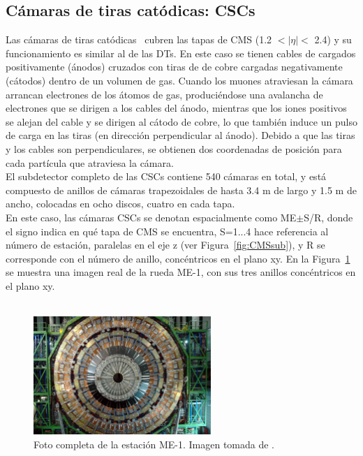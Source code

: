 \subsection{C\'amaras de tiras cat\'odicas: CSCs}\label{sec:CSCs}

Las c\'amaras de tiras cat\'odicas~\cite{CSCperformance} cubren las tapas de CMS (1.2 $< \lvert \eta \rvert <$ 2.4) y su funcionamiento es similar al de las DTs. En este caso se tienen cables de cargados positivamente (\'anodos) cruzados con tiras de de cobre cargadas negativamente (c\'atodos) dentro de un volumen de gas. Cuando los muones atraviesan la c\'amara arrancan electrones de los \'atomos de gas, produci\'endose una avalancha de electrones que se dirigen a los cables del \'anodo, mientras que los iones positivos se alejan del cable y se dirigen al c\'atodo de cobre, lo que tambi\'en induce un pulso de carga en las tiras (en direcci\'on perpendicular al \'anodo). Debido a que las tiras y los cables son perpendiculares, se obtienen dos coordenadas de posici\'on para cada part\'icula que atraviesa la c\'amara. \\

El subdetector completo de las CSCs contiene 540 c\'amaras en total, y est\'a compuesto de anillos de c\'amaras trapezoidales de hasta 3.4 m de largo y 1.5 m de ancho, colocadas en ocho discos, cuatro en cada tapa. \\
En este caso, las c\'amaras CSCs se denotan espacialmente como ME$\pm$S/R, donde el signo indica en qu\'e tapa de CMS se encuentra, S=1...4 hace referencia al n\'umero de estaci\'on, paralelas en el eje z (ver Figura~\ref{fig:CMSsub}), y R se corresponde con el n\'umero de anillo, conc\'entricos en el plano xy. En la Figura~\ref{fig:CSC_MEm1} se muestra una imagen real de la rueda ME-1, con sus tres anillos conc\'entricos en el plano xy. \\ \\ 

\begin{figure}[h]
\centering
\includegraphics[width=0.60\textwidth]{figures/CSC_MEm1.jpg}
\caption{Foto completa de la estaci\'on ME-1. Imagen tomada de \cite{Breedon:1431505}.}
\label{fig:CSC_MEm1}        
\end{figure}


